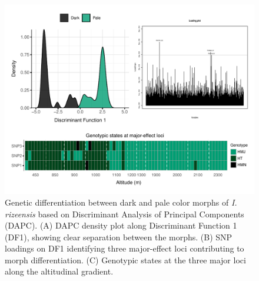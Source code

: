\documentclass[9pt,a4paper,twoside]{rho-class/rho}
\begin{document}
\begin{figure}[b!]
\centering
\includegraphics[width=1.8\columnwidth]{Figure_4.pdf}
\caption{Genetic differentiation between dark and pale color morphs of \textit{I. rizeensis} based on Discriminant Analysis of Principal Components (DAPC). (A) DAPC density plot along Discriminant Function 1 (DF1), showing clear separation between the morphs. (B) SNP loadings on DF1 identifying three major-effect loci contributing to morph differentiation. (C) Genotypic states at the three major loci along the altitudinal gradient.}
\label{Figure 5}
\end{figure}
\end{document}
